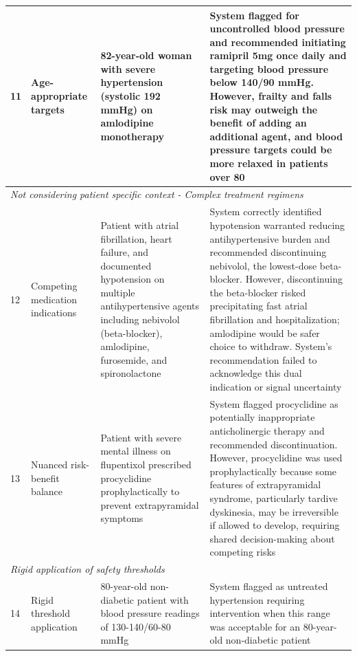 {\begin{longtable}{p{}p{}p{}p{}}
                \midrule
                \hypertarget{vignette-11}{11} & Age-appropriate targets & 82-year-old woman with severe hypertension (systolic 192 mmHg) on amlodipine monotherapy & System flagged for uncontrolled blood pressure and recommended initiating ramipril 5mg once daily and targeting blood pressure below 140/90 mmHg. However, frailty and falls risk may outweigh the benefit of adding an additional agent, and blood pressure targets could be more relaxed in patients over 80 \\
                \midrule
                \multicolumn{4}{l}{\textit{Not considering patient specific context - Complex treatment regimens}} \\
                \midrule
                \hypertarget{vignette-12}{12} & Competing medication indications & Patient with atrial fibrillation, heart failure, and documented hypotension on multiple antihypertensive agents including nebivolol (beta-blocker), amlodipine, furosemide, and spironolactone & System correctly identified hypotension warranted reducing antihypertensive burden and recommended discontinuing nebivolol, the lowest-dose beta-blocker. However, discontinuing the beta-blocker risked precipitating fast atrial fibrillation and hospitalization; amlodipine would be safer choice to withdraw. System's recommendation failed to acknowledge this dual indication or signal uncertainty \\
                \midrule
                \hypertarget{vignette-13}{13} & Nuanced risk-benefit balance & Patient with severe mental illness on flupentixol prescribed procyclidine prophylactically to prevent extrapyramidal symptoms & System flagged procyclidine as potentially inappropriate anticholinergic therapy and recommended discontinuation. However, procyclidine was used prophylactically because some features of extrapyramidal syndrome, particularly tardive dyskinesia, may be irreversible if allowed to develop, requiring shared decision-making about competing risks \\
                \midrule
                \multicolumn{4}{l}{\textit{Rigid application of safety thresholds}} \\
                \midrule
                \hypertarget{vignette-14}{14} & Rigid threshold application & 80-year-old non-diabetic patient with blood pressure readings of 130-140/60-80 mmHg & System flagged as untreated hypertension requiring intervention when this range was acceptable for an 80-year-old non-diabetic patient \\
                \midrule

\end{longtable}}
